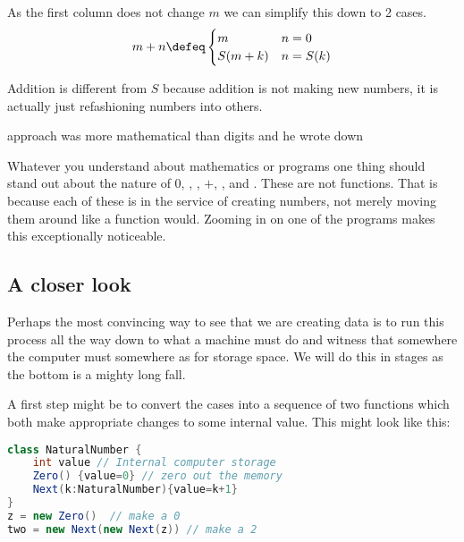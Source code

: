 As the first column does not change $m$ we can simplify this down to 2 cases.
\begin{align*}
    m+n \defeq \begin{cases} m & n=0\\ S(m+k) & n=S(k)\end{cases}
\end{align*}



Addition is different from $S$ because addition is not making new 
numbers, it is actually just refashioning numbers into others.

approach was 
more mathematical than digits and he wrote down 



\newpage

Whatever you understand about mathematics or programs one thing should 
stand out about the nature of $0$, , , 
$+$, , and .  These are not functions.  
That is because each of these is in the service of creating 
numbers, not merely moving them around like a function would.
Zooming in on one of the programs makes this exceptionally noticeable.

\subsection{A closer look}
Perhaps the most convincing way to see that we are creating 
data is to run this process all the way down to what a machine 
must do and witness that somewhere the computer must somewhere 
as for storage space.  We will do this 
in stages as the bottom is a mighty long fall.

A first step might be to convert the cases into a sequence 
of two functions which both make appropriate changes to 
some internal value.  This might look like this:
\begin{center}
\begin{lstlisting}[language=Java]
class NaturalNumber {
    int value // Internal computer storage
    Zero() {value=0} // zero out the memory
    Next(k:NaturalNumber){value=k+1}
}
z = new Zero()  // make a 0
two = new Next(new Next(z)) // make a 2
\end{lstlisting}
\end{center}

